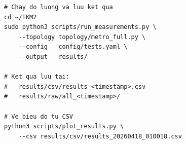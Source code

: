 \begin{lstlisting}[style=bashstyle, caption={Chạy bộ đo lường tự động}]
# Chay do luong va luu ket qua
cd ~/TKM2
sudo python3 scripts/run_measurements.py \
    --topology topology/metro_full.py \
    --config   config/tests.yaml \
    --output   results/

# Ket qua luu tai:
#   results/csv/results_<timestamp>.csv
#   results/raw/all_<timestamp>/

# Ve bieu do tu CSV
python3 scripts/plot_results.py \
    --csv results/csv/results_20260418_010018.csv
\end{lstlisting}
